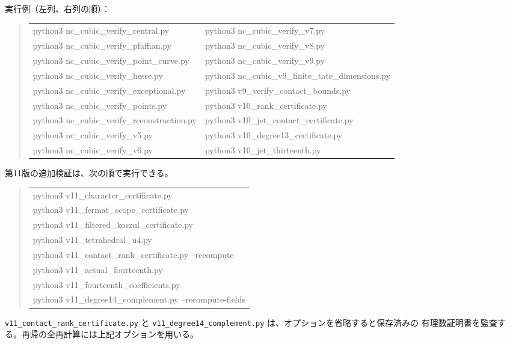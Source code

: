実行例（左列、右列の順）：
\begin{quote}\footnotesize\ttfamily
\begin{tabular}{@{}ll@{}}
python3 nc\_cubic\_verify\_central.py & python3 nc\_cubic\_verify\_v7.py \\
python3 nc\_cubic\_verify\_pfaffian.py & python3 nc\_cubic\_verify\_v8.py \\
python3 nc\_cubic\_verify\_point\_curve.py & python3 nc\_cubic\_verify\_v9.py \\
python3 nc\_cubic\_verify\_hesse.py & python3 nc\_cubic\_v9\_finite\_tate\_dimensions.py \\
python3 nc\_cubic\_verify\_exceptional.py & python3 v9\_verify\_contact\_bounds.py \\
python3 nc\_cubic\_verify\_points.py & python3 v10\_rank\_certificate.py \\
python3 nc\_cubic\_verify\_reconstruction.py & python3 v10\_jet\_contact\_certificate.py \\
python3 nc\_cubic\_verify\_v5.py & python3 v10\_degree13\_certificate.py \\
python3 nc\_cubic\_verify\_v6.py & python3 v10\_jet\_thirteenth.py \\
\end{tabular}
\end{quote}

第11版の追加検証は、次の順で実行できる。
\begin{quote}\footnotesize\ttfamily
\begin{tabular}{@{}l@{}}
python3 v11\_character\_certificate.py\\
python3 v11\_fermat\_scope\_certificate.py\\
python3 v11\_filtered\_koszul\_certificate.py\\
python3 v11\_tetrahedral\_u4.py\\
python3 v11\_contact\_rank\_certificate.py --recompute\\
python3 v11\_actual\_fourteenth.py\\
python3 v11\_fourteenth\_coefficients.py\\
python3 v11\_degree14\_complement.py --recompute-fields\\
\end{tabular}
\end{quote}
\texttt{v11\_contact\_rank\_certificate.py} と
\texttt{v11\_degree14\_complement.py} は、オプションを省略すると保存済みの
有理数証明書を監査する。再帰の全再計算には上記オプションを用いる。


